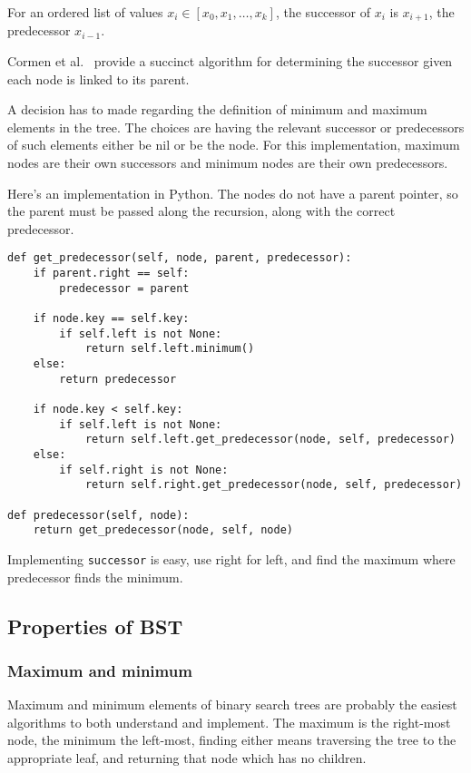 \documentclass{article}
\begin{document}
For an ordered list of values $x_i \in [x_0, x_1,\ldots,x_k]$, the successor of
$x_i$ is $x_{i+1}$, the predecessor $x_{i-1}$.

Cormen et al.~\cite[p. 248-249]{cormen:th:1990} provide a succinct algorithm for
determining the successor given each node is linked to its parent.

A decision has to made regarding the definition of minimum and maximum
elements in the tree. The choices are having the relevant successor or
predecessors of such elements either be nil or be the node. For this implementation,
maximum nodes are their own successors and minimum nodes are their
own predecessors.

Here's an implementation in Python. The nodes do not have a parent
pointer, so the parent must be passed along the recursion, along with
the correct predecessor.

\begin{lstlisting}[frame=single]
def get_predecessor(self, node, parent, predecessor):
    if parent.right == self:
        predecessor = parent

    if node.key == self.key:
        if self.left is not None:
            return self.left.minimum()
    else:
        return predecessor

    if node.key < self.key:
        if self.left is not None:
            return self.left.get_predecessor(node, self, predecessor)
    else:
        if self.right is not None:
            return self.right.get_predecessor(node, self, predecessor)

def predecessor(self, node):
    return get_predecessor(node, self, node)
\end{lstlisting}

Implementing {\tt successor} is easy, use right for left, and find the
maximum where predecessor finds the minimum.



\subsection{Properties of BST}


\subsubsection{Maximum and minimum}

Maximum and minimum elements of binary search trees are probably the easiest
algorithms to both understand and implement. The maximum is the right-most
node, the minimum the left-most, finding either means traversing the tree
to the appropriate leaf, and returning that node which has no children.
\end{document}
